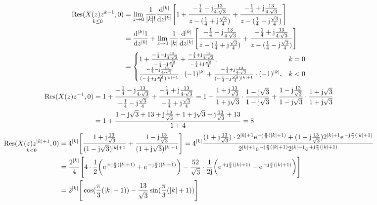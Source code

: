 \begin{align}
	\underset{k\leq0}{\mathrm{Res}(X(z)z^{k-1},0)}&=\lim\limits_{z\rightarrow0}\frac{1}{|k|!}\frac{\mathrm{d}^{|k|}}{\mathrm{d}z^{|k|}}\Bigg [1+\frac{-\frac{1}{4}-\im\frac{13}{4\cdot\sqrt{3}}}{z-(\frac{1}{4}+\im\frac{\sqrt{3}}{4})}+\frac{-\frac{1}{4}+\im\frac{13}{4\cdot\sqrt{3}}}{z-(\frac{1}{4}-\im\frac{\sqrt{3}}{4})}\Bigg]\nonumber\\
	&=\frac{\mathrm{d}^{|k|}1}{\mathrm{d}z^{|k|}}+\lim\limits_{z\rightarrow0}\frac{1}{|k|}\frac{\mathrm{d}^{|k|}}{\mathrm{d}z^{|k|}}\Bigg[\frac{-\frac{1}{4}-\im\frac{13}{4\cdot\sqrt{3}}}{z-(\frac{1}{4}+\im\frac{\sqrt{3}}{4})}+\frac{-\frac{1}{4}+\im\frac{13}{4\cdot\sqrt{3}}}{z-(\frac{1}{4}-\im\frac{\sqrt{3}}{4})}\Bigg] \nonumber \\
	&=\begin{cases}
		1+\frac{-\frac{1}{4}-\im\frac{13}{4\cdot\sqrt{3}}}{-\frac{1}{4}-\im\frac{\sqrt{3}}{4}}+\frac{-\frac{1}{4}+\im\frac{13}{4\cdot\sqrt{3}}}{-\frac{1}{4}+\im\frac{\sqrt{3}}{4}}, &k = 0 \\
		\frac{-\frac{1}{4}-\im\frac{13}{4\cdot\sqrt{3}}}{(-\frac{1}{4}+\im\frac{\sqrt{3}}{4})^{|k|+1}}\cdot(-1)^{|k|}+\frac{-\frac{1}{4}+\im\frac{13}{4\cdot\sqrt{3}}}{(-\frac{1}{4}-\im\frac{\sqrt{3}}{4})^{|k|+1}}\cdot(-1)^{|k|}, &k <0
	\end{cases}
\end{align}
\begin{align}
		\mathrm{Res}(X(z)z^{-1},0)&= 1+\frac{-\frac{1}{4}-\im\frac{13}{4\cdot\sqrt{3}}}{-\frac{1}{4}-\im\frac{\sqrt{3}}{4}}+\frac{-\frac{1}{4}+\im\frac{13}{4\cdot\sqrt{3}}}{-\frac{1}{4}+\im\frac{\sqrt{3}}{4}}=1+\frac{1+\im\frac{13}{\sqrt{3}}}{1+\im\sqrt{3}}\cdot\frac{1-\im\sqrt{3}}{1-\im\sqrt{3}}+\frac{1-\im\frac{13}{\sqrt{3}}}{1-\im\sqrt{3}}\cdot\frac{1+\im\sqrt{3}}{1+\im\sqrt{3}}\nonumber\\
		&=1+\frac{1-\im\sqrt{3}+13+\im\frac{13}{\sqrt{3}}+1+\im\sqrt{3}-\im\frac{13}{\sqrt{3}}+13}{1+4}=8
\end{align}
\begin{align}
	\underset{k<0}{\mathrm{Res}(X(z)z^{|k|+1},0)}&=4^{|k|}\Bigg[\frac{1+\im\frac{13}{\sqrt{3}}}{(1-\im\sqrt{3})^{|k|+1}}+\frac{1-\im\frac{13}{\sqrt{3}}}{(1+\im\sqrt{3})^{|k|+1}} \Bigg]=4^{|k|}\frac{(1+\im\frac{13}{\sqrt{3}})\cdot2^{|k|+1}\e^{+\im\frac{\pi}{3}(|k|+1)}+(1-\im\frac{13}{\sqrt{3}})2^{|k|+1}\e^{-\im\frac{\pi}{3}(|k|+1)}}{2^{|k|+1}\e^{-\im\frac{\pi}{3}(|k|+1)}2^{|k|+1}\e^{+\im\frac{\pi}{3}(|k|+1)}}\nonumber\\
	&=\frac{2^{|k|}}{4}\Bigg [4\cdot\frac{1}{2}\bigg(\e^{+\im\frac{\pi}{3}(|k|+1)}+\e^{-\im\frac{\pi}{3}(|k|+1)}\bigg)-\frac{52}{\sqrt{3}}\cdot\frac{1}{2\im}\bigg(\e^{+\im\frac{\pi}{3}(|k|+1)}-\e^{-\im\frac{\pi}{3}(|k|+1)}\bigg)\Bigg]\nonumber\\
	&=2^{|k|}\Bigg[\cos(\frac{\pi}{3}(|k|+1))-\frac{13}{\sqrt{3}}\sin(\frac{\pi}{3}(|k|+1))\Bigg]
\end{align}
